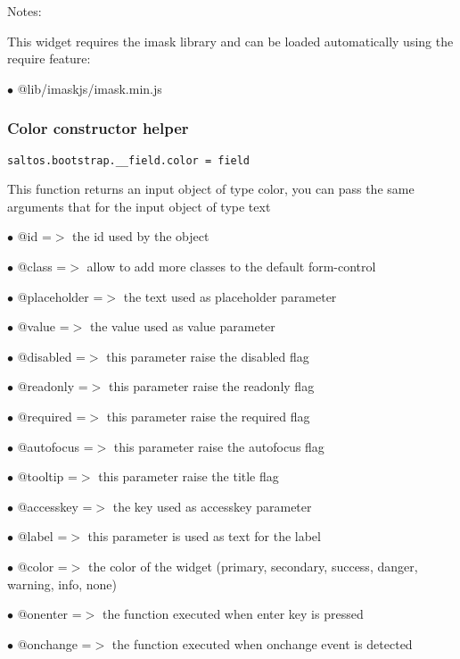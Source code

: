 \documentclass[a4paper]{article}
\begin{document}
Notes:

This widget requires the imask library and can be loaded automatically using the require
feature:

\begin{compactitem}
\item[\color{myblue}$\bullet$] @lib/imaskjs/imask.min.js
\end{compactitem}

\hypertarget{toc612}{}
\subsubsection{Color constructor helper}

\begin{lstlisting}
saltos.bootstrap.__field.color = field
\end{lstlisting}

This function returns an input object of type color, you can pass the same
arguments that for the input object of type text

\begin{compactitem}
\item[\color{myblue}$\bullet$] @id          =$>$ the id used by the object
\item[\color{myblue}$\bullet$] @class       =$>$ allow to add more classes to the default form-control
\item[\color{myblue}$\bullet$] @placeholder =$>$ the text used as placeholder parameter
\item[\color{myblue}$\bullet$] @value       =$>$ the value used as value parameter
\item[\color{myblue}$\bullet$] @disabled    =$>$ this parameter raise the disabled flag
\item[\color{myblue}$\bullet$] @readonly    =$>$ this parameter raise the readonly flag
\item[\color{myblue}$\bullet$] @required    =$>$ this parameter raise the required flag
\item[\color{myblue}$\bullet$] @autofocus   =$>$ this parameter raise the autofocus flag
\item[\color{myblue}$\bullet$] @tooltip     =$>$ this parameter raise the title flag
\item[\color{myblue}$\bullet$] @accesskey   =$>$ the key used as accesskey parameter
\item[\color{myblue}$\bullet$] @label       =$>$ this parameter is used as text for the label
\item[\color{myblue}$\bullet$] @color       =$>$ the color of the widget (primary, secondary, success, danger, warning, info, none)
\item[\color{myblue}$\bullet$] @onenter     =$>$ the function executed when enter key is pressed
\item[\color{myblue}$\bullet$] @onchange    =$>$ the function executed when onchange event is detected
\end{compactitem}
\end{document}

